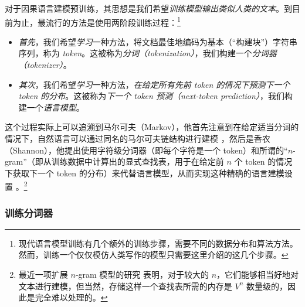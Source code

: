 \documentclass[../../book-main_zh.tex]{subfiles}
\begin{document}
对于因果语言建模预训练，其思想是我们希望\textit{训练模型输出类似人类的文本}。到目前为止，最流行的方法是使用两阶段训练过程：\footnote{现代语言模型训练有几个额外的训练步骤，需要不同的数据分布和算法方法。然而，训练一个仅仅模仿人类写作的模型只需要这里介绍的这几个步骤。}
\begin{itemize}
\item \textit{首先}，我们希望\textit{学习}一种方法，将文档最佳地编码为基本（“构建块”）字符串序列，称为 \textit{token}。这被称为\textit{分词（tokenization）}，我们构建一个\textit{分词器（tokenizer）}。
\item \textit{其次}，我们希望\textit{学习}一种方法，\textit{在给定所有先前 token 的情况下预测下一个 token 的分布}。这被称为\textit{下一个 token 预测（next-token prediction）}，我们构建一个\textit{语言模型}。
\end{itemize}
这个过程实际上可以追溯到马尔可夫（Markov），他首先注意到在给定适当分词的情况下，自然语言可以通过同名的马尔可夫链结构进行建模 \citep{markov2006example}，然后是香农（Shannon），他提出使用字符级分词器（即每个字符是一个 token）和所谓的“\(n\)-gram”（即从训练数据中计算出的显式查找表，用于在给定前 \(n\) 个 token 的情况下获取下一个 token 的分布）来代替语言模型，从而实现这种精确的语言建模设置 \citep{Shannon-1948}。\footnote{最近一项扩展 \(n\)-gram 模型的研究 \citep{liu2024infini} 表明，对于较大的 \(n\)，它们能够相当好地对文本进行建模，但当然，存储这样一个查找表所需的内存是 \(V^{n}\) 数量级的，因此是完全难以处理的。}

\subsubsection{训练分词器}
\end{document}
